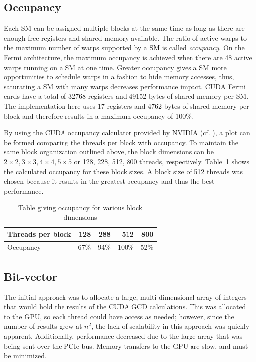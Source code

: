 \documentclass[smallextended]{svjour3}       %
\begin{document}
\subsection{Occupancy}
\label{sec:occupancy}
Each SM can be assigned multiple blocks at the same time as long as there are 
enough free registers and shared memory available. The ratio of active warps 
to the maximum number of warps supported by a SM is called \emph{occupancy}. 
On the Fermi architecture, the maximum occupancy is achieved when there are 48 
active warps running on a SM at one time. Greater occupancy gives a SM more
opportunities to schedule warps in a fashion to hide memory accesses, thus,
saturating a SM with many warps decreases performance impact. CUDA Fermi cards
have a total of 32768 registers and 49152 bytes of shared memory per SM. The
implementation here uses 17 registers and 4762 bytes of shared memory per
block and therefore results in a maximum occupancy of 100\%.

By using the CUDA occupancy calculator provided by NVIDIA (cf. 
\cite{nvidia2012gpu}), a plot can be formed comparing the threads per block 
with occupancy. To maintain the same block organization outlined above, the 
block dimensions can be $2\times2, 3\times3, 4\times4, 5\times5$ or 128, 228, 
512, 800 threads, respectively. Table~\ref{tab:occupancy} shows the calculated 
occupancy for these block sizes. A block size of 512 threads was chosen 
because it results in the greatest occupancy and thus the best performance. 

\begin{table}
   \centering
   \begin{tabular}{l|rrrr}
      Threads per block & 128 & 288 & 512 & 800\\
      \hline
              Occupancy & 67\% & 94\% & 100\% & 52\%\\
   \end{tabular}
   \caption{Table giving occupancy for various block dimensions}
   \label{tab:occupancy}
\end{table}

\subsection{Bit-vector}
\label{subsec:bitvector}
The initial approach was to allocate a large, multi-dimensional array of 
integers that would hold the results of the CUDA GCD calculations. This was 
allocated to the GPU, so each thread could have access as needed; however, 
since the number of results grew at $n^2$, the lack of scalability in this 
approach was quickly apparent. Additionally, performance decreased due to the 
large array that was being sent over the PCIe bus. Memory transfers to 
the GPU are slow, and must be minimized.
\end{document}
